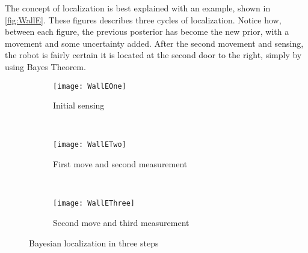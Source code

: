 \documentclass[Main]{subfiles}
\begin{document}
The concept of localization is best explained with an example, shown in \autoref{fig:WallE}.
These figures describes three cycles of localization. 
Notice how, between each figure, the previous posterior has become the new prior, with a movement and some uncertainty added. 
After the second movement and sensing, the robot is fairly certain it is located at the second door to the right, simply by using Bayes Theorem.\\
\begin{figure}[H]
	\centering
	\begin{subfigure}[b]{0.8\linewidth}
		\texttt{[image: WallEOne]}
		\caption{Initial sensing}
		\label{fig:WallEOne}
	\end{subfigure}\\
	\vspace{12pt} 
	\begin{subfigure}[b]{0.8\linewidth}
		\texttt{[image: WallETwo]}
		\caption{First move and second measurement}
		\label{fig:WallETwo}
	\end{subfigure}\\
	\vspace{12pt}
	\begin{subfigure}[b]{0.8\linewidth}
		\texttt{[image: WallEThree]}
		\caption{Second move and third measurement}
		\label{fig:WallEThree}
	\end{subfigure}
	\caption{Bayesian localization in three steps}
	\label{fig:WallE}
\end{figure}
\end{document}
